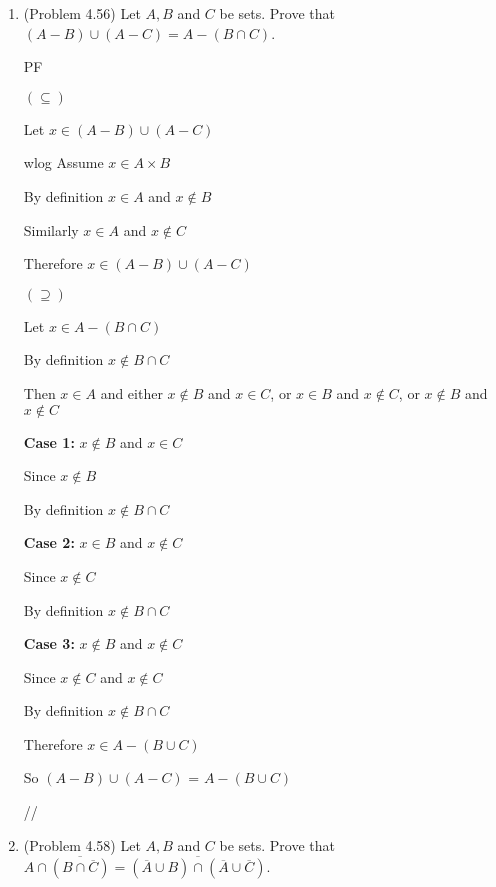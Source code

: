 \documentclass[12pt]{article}
\begin{document}
\begin{enumerate}
{//
}



\item (Problem 4.56) Let $A, B$ and $C$ be sets.  Prove that $(A - B) \cup (A - C) = A - (B \cap C)$.
{PF

$(\subseteq )$

Let $x \in (A - B) \cup (A - C)$

wlog Assume $x \in A \times B$

By definition $x \in A$ and $x \notin B$ 

Similarly $x \in A$ and $x \notin C$ 

Therefore $x \in (A - B) \cup (A - C)$

$(\supseteq)$

Let $x \in A - ( B \cap  C)$

By definition $x \notin B \cap C$ 

Then $x \in A$ and either $x \notin B$ and  $x \in C$, or $x \in B$ and  $x \notin C$, or $x \notin B$ and  $x \notin C$
\vspace{5mm}

\textbf{Case 1:}  $x \notin B$ and  $x \in C$

Since $x \notin B$

By definition $x \notin B \cap C$

\vspace{5mm}

\textbf{Case 2:}  $x \in B$ and  $x \notin C$

Since $x \notin C$

By definition $x \notin B \cap C$

\vspace{5mm}


\textbf{Case 3:}  $x \notin B$ and  $x \notin C$

Since $x \notin C$ and  $x \notin C$

By definition $x \notin B \cap C$

\vspace{5mm}

Therefore $x \in A - ( B \cup  C)$

So $(A - B) \cup (A - C)$ = $A - ( B \cup  C)$

//
}




\item (Problem 4.58) Let $A, B$ and $C$ be sets.  Prove that $A \cap \overline{(B \cap \overline{C})} = \overline{(\overline{A} \cup B) \cap (\overline{A} \cup \overline{C})}$.


\end{enumerate}
\end{document}
